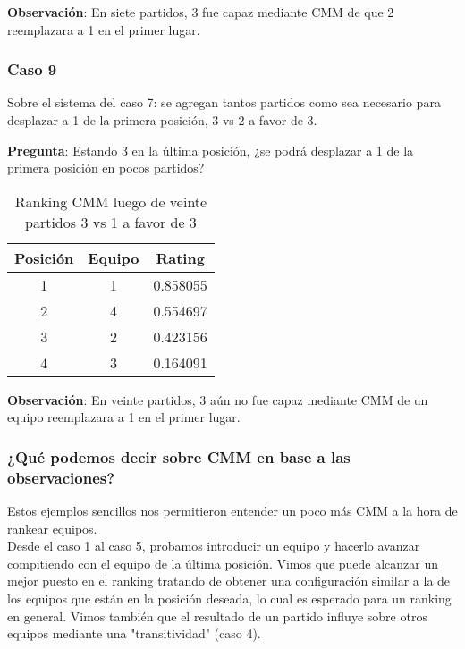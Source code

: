 \textbf{Observación}: En siete partidos, 3 fue capaz mediante CMM de que 2 reemplazara a 1 en el primer lugar.

\subsubsection*{Caso 9}

Sobre el sistema del caso 7: se agregan tantos partidos como sea necesario para desplazar a 1 de la primera posición, 3 vs 2 a favor de 3.

\textbf{Pregunta}: Estando 3 en la última posición, ¿se podrá desplazar a 1 de la primera posición en pocos partidos?

\begin{table}[h!]
    \begin{center}
        \begin{tabular}{|c|c|c|}
        \hline
        \textbf{Posición} & \textbf{Equipo} & \textbf{Rating} \\
        \hline
        1 & 1 & 0.858055\\
        2 & 4 & 0.554697\\
        3 & 2 & 0.423156\\
        4 & 3 & 0.164091\\
        \hline
        \end{tabular}
        \caption{Ranking CMM luego de veinte partidos 3 vs 1 a favor de 3}
        \label{cmm_caso_9}
    \end{center}
\end{table}

\textbf{Observación}: En veinte partidos, 3 aún no fue capaz mediante CMM de un equipo reemplazara a 1 en el primer lugar.

\subsubsection{¿Qué podemos decir sobre CMM en base a las observaciones?}

Estos ejemplos sencillos nos permitieron entender un poco más CMM a la hora de rankear equipos.\\

Desde el caso 1 al caso 5, probamos introducir un equipo y hacerlo avanzar compitiendo con el equipo de la última posición. Vimos que puede alcanzar un mejor puesto en el ranking tratando de obtener una configuración similar a la de los equipos que están en la posición deseada, lo cual es esperado para un ranking en general. Vimos también que el resultado de un partido influye sobre otros equipos mediante una "transitividad" (caso 4).\\

